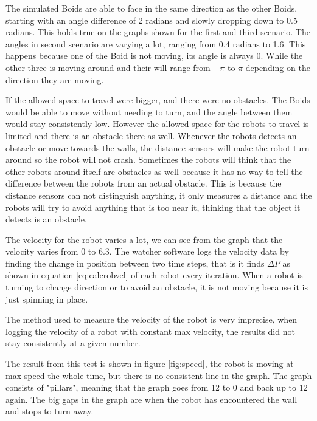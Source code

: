 The simulated Boids are able to face in the same direction as the other Boids, starting with an angle difference of 2 radians and slowly dropping down to 0.5 radians. This holds true on the graphs shown for the first and third scenario. The angles in second scenario are varying a lot, ranging from 0.4 radians to 1.6. This happens because one of the Boid is not moving, its angle is always 0. While the other three is moving around and their will range from $-\pi$ to $\pi$ depending on the direction they are moving.

If the allowed space to travel were bigger, and there were no obstacles. The Boids would be able to move without needing to turn, and the angle between them would stay consistently low. However the allowed space for the robots to travel is limited and there is an obstacle there as well.
Whenever the robots detects an obstacle or move towards the walls, the distance sensors will make the robot turn around so the robot will not crash. Sometimes the robots will think that the other robots around itself are obstacles as well because it has no way to tell the difference between the robots from an actual obstacle. This is because the distance sensors can not distinguish anything, it only measures a distance and the robots will try to avoid anything that is too near it, thinking that the object it detects is an obstacle.

The velocity for the robot varies a lot, we can see from the graph that the velocity varies from 0 to 6.3. The watcher software logs the velocity data by finding the change in position between two time steps, that is it finds $\Delta P$ as shown in equation \ref{eq:calcrobvel} of each robot every iteration. When a robot is turning to change direction or to avoid an obstacle, it is not moving because it is just spinning in place. 

The method used to measure the velocity of the robot is very imprecise, when logging the velocity of a robot with constant max velocity, the results did not stay consistently at a given number. 

The result from this test is shown in figure \ref{fig:speed}, the robot is moving at max speed the whole time, but there is no consistent line in the graph. The graph consists of "pillars", meaning that the graph goes from 12 to 0 and back up to 12 again. The big gaps in the graph are when the robot has encountered the wall and stops to turn away.

